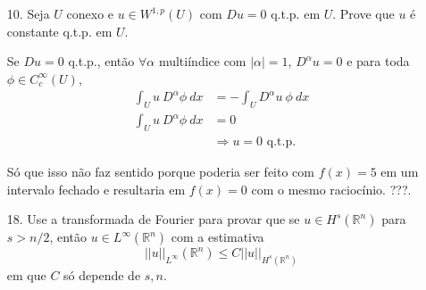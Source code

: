 \documentclass[11pt]{article}
\newcommand{\Rn}{{\mathbb{R}^n}}
\begin{document}
\begin{enumerate}
	\item[10.]\label{prob:U-conexo_u-constante} Seja $U$ conexo e $u \in W^{1,p}(U)$ com $Du=0$ q.t.p. em $U$. Prove que $u$ é constante q.t.p. em $U$.
	
	Se $Du=0$ q.t.p., então $\forall\alpha$ multiíndice com $|\alpha|=1$, $D^\alpha u =0$ e para toda $\phi\in C^\infty_c(U)$,\begin{align*}
		\int_U u\ D^\alpha \phi\ dx &= - \int_U D^\alpha u \ \phi \ dx \\
		\int_U u\ D^\alpha \phi\ dx &= 0\\
		&\Rightarrow u =0 \text{ q.t.p. }
	\end{align*}

	Só que isso não faz sentido porque poderia ser feito com $f(x)=5$ em um intervalo fechado e resultaria em $f(x)=0$ com o mesmo raciocínio. ???.

	\item[18.] Use a transformada de Fourier para provar que se $u \in H^s(\Rn)$ para $s> n/2$, então $u \in L^{\infty}(\Rn)$ com a estimativa \[ ||u||_{L^\infty}(\Rn) \leq C ||u||_{H^s(\Rn)} \] em que $C$ só depende de $s,n$.
\end{enumerate}
\end{document}
